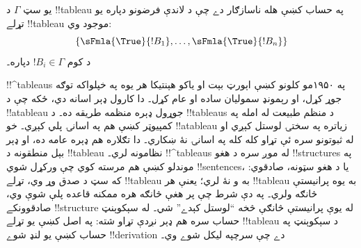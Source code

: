 \documentclass[../../../include/open-logic-section]{subfiles}
\begin{document}
يو سټ $\Gamma$ د !!{tableau} په حساب کښې هله ناسازګار دے چې د
لاندې فرضونو دپاره يو تړلے !!{tableau} موجود وي:
\[
\{\sFmla{\True}{!B_1}, \dots, \sFmla{\True}{!B_n}\} 
\]
د کوم $!B_i \in \Gamma$ دپاره۔

!!^{tableau}s په ۱۹۵۰مو کلونو کښې اېورټ بېت او ياکو هېنتيکا هر يوه
په خپلواکه توګه جوړ کړل، او رېمونډ سموليان ساده او عام کړل۔ دا کارول
ډېر اسانه دي، ځکه چې د !!a{tableau} جوړول ډېره منظمه طريقه ده۔ د
!!{tableau}s د منظم طبيعت له امله په کمپيوټر کښې هم په اسانۍ پلي
کېږي۔ خو !!a{tableau} زياتره په سختۍ لوستل کېږي او له ثبوتونو سره ئې
تړاو کله کله په اسانۍ نۀ ښکاري۔ دا تګلاره هم ډېره عامه ده، او ډېر
بېل منطقونه د !!{tableau} نظامونه لري۔ !!^{tableau}s له موږ سره د
هغو !!{structure}s په موندلو کښې هم مرسته کوي چې ورکړل شوي
!!{sentence}s، يا د هغو سټونه، صادقوي: که سټ د صدق وړ وي، تړلے
!!{tableau} به و نۀ لري؛ يعنې هر !!{tableau} به يوه پرانيستې څانګه
ولري۔ په دې شرط چې پر هغې څانګه هره ممکنه قاعده پلې شوې وي،
صادقوونکے !!{structure} له يوې پرانيستې څانګې څخه ``لوستل کېدے''
شي۔ له سېکوېنټ حساب سره هم ډېر نږدې تړاو شته: په اصل کښې يو تړلے
!!{tableau} د سېکوېنټ په حساب کښې يو لنډ شوے !!{derivation} دے چې
سرچپه ليکل شوے وي۔
\end{document}

